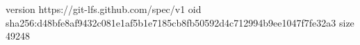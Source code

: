 version https://git-lfs.github.com/spec/v1
oid sha256:d48bfe8af9432c081e1af5b1e7185cb8fb50592d4c712994b9ee1047f7fe32a3
size 49248
